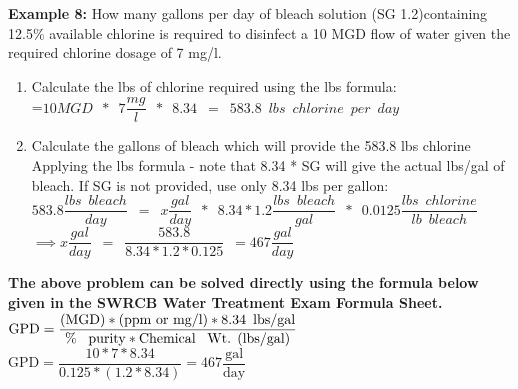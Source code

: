 \textbf{Example 8:} How many gallons per day of bleach solution (SG 1.2)containing 12.5\% available chlorine is required to disinfect a 10 MGD flow of water given the required chlorine dosage of 7 mg/l.\\
\begin{enumerate}
\item Calculate the lbs of chlorine required using the lbs formula:\\
\vspace{0.5cm}
=$10 MGD \enspace * \enspace 7 \dfrac{mg}{l} \enspace * \enspace 8.34\enspace=\enspace 583.8 \enspace lbs \enspace chlorine \enspace per \enspace day$\\
\vspace{0.5cm}
\item Calculate the gallons of bleach which will provide the 583.8 lbs chlorine\\
\vspace{0.5cm}
Applying the lbs formula - note that 8.34 * SG will give the actual lbs/gal of bleach.  If SG is not provided, use only 8.34 lbs per gallon:\\
\vspace{0.5cm}
$583.8 \dfrac{lbs \enspace bleach}{day}\enspace=\enspace x \dfrac{gal}{day} \enspace * \enspace 8.34 * 1.2 \dfrac{lbs \enspace bleach}{gal} \enspace * \enspace 0.0125 \dfrac{lbs \enspace chlorine}{lb \enspace bleach} \enspace $\\
\vspace{0.5cm}
$ \implies x \dfrac{gal}{day}\enspace = \enspace \dfrac{583.8}{8.34*1.2*0.125} \enspace = \boxed{467 \dfrac{gal}{day}}$
\end{enumerate}
\vspace{0.3cm}
\textbf{The above problem can be solved directly using the formula below given in the SWRCB Water Treatment Exam Formula Sheet.}\\
\vspace{0.3cm}
 $\textrm{GPD}=\dfrac{\textrm{(MGD)}*\textrm{(ppm or mg/l)}*8.34 \enspace \textrm{lbs/gal}}{\textrm{\% \enspace purity}*\textrm{Chemical \enspace Wt. (lbs/gal)}}$ 
 \vspace{0.3cm}
 $\textrm{GPD}=\dfrac{10*7*8.34}{0.125*(1.2*8.34)}=\boxed{467 \dfrac{\textrm{gal}}{\textrm{day}}}$ 


